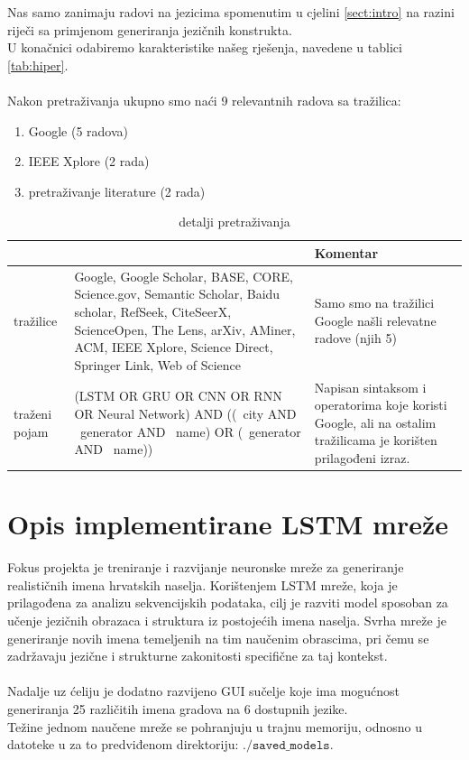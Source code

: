 \documentclass[conference]{IEEEtran}
\begin{document}
Nas samo zanimaju radovi na jezicima spomenutim u cjelini \ref{sect:intro} na razini riječi sa primjenom generiranja jezičnih konstrukta.\\
U konačnici odabiremo karakteristike našeg rješenja, navedene u tablici \ref{tab:hiper}.\\
\\
Nakon pretraživanja ukupno smo naći 9 relevantnih radova sa tražilica:
\begin{enumerate}
\item Google (5 radova)
\item IEEE Xplore (2 rada)
\item pretraživanje literature (2 rada)
\end{enumerate}
\begin{table}[htbp]
\caption{detalji pretraživanja}
\begin{center}
\begin{tabular}{|p{50pt}|p{110pt}|p{70pt}|}
\hline
 & & \textbf{Komentar}\\ \hline
tražilice & Google, Google Scholar, BASE, CORE, Science.gov, Semantic Scholar, Baidu scholar, RefSeek, CiteSeerX, ScienceOpen, The Lens, arXiv, AMiner, ACM, IEEE Xplore, Science Direct,  Springer Link, Web of Science & Samo smo na tražilici Google našli relevatne radove (njih 5)  \\ \hline
traženi pojam & (LSTM OR GRU OR CNN OR RNN OR Neural Network) AND ((~city AND ~generator AND ~name) OR (~generator AND ~name)) & Napisan sintaksom i operatorima koje koristi Google, ali na ostalim tražilicama je korišten prilagođeni izraz.\\ \hline
\end{tabular}
\label{tab:trening}
\end{center}
\end{table}





\section{Opis implementirane LSTM mreže}
Fokus projekta je treniranje i razvijanje neuronske mreže za generiranje realističnih imena hrvatskih naselja. Korištenjem LSTM mreže, koja je prilagođena za analizu sekvencijskih podataka, cilj je razviti model sposoban za učenje jezičnih obrazaca i struktura iz postojećih imena naselja. Svrha mreže je generiranje novih imena temeljenih na tim naučenim obrascima, pri čemu se zadržavaju jezične i strukturne zakonitosti specifične za taj kontekst.\\
\\
Nadalje uz ćeliju je dodatno razvijeno GUI sučelje koje ima mogućnost generiranja 25 različitih imena gradova na 6 dostupnih jezike.\\
Težine jednom naučene mreže se pohranjuju u trajnu memoriju, odnosno u datoteke u za to predviđenom direktoriju: $\mathtt{./saved\_models}$.
\end{document}
